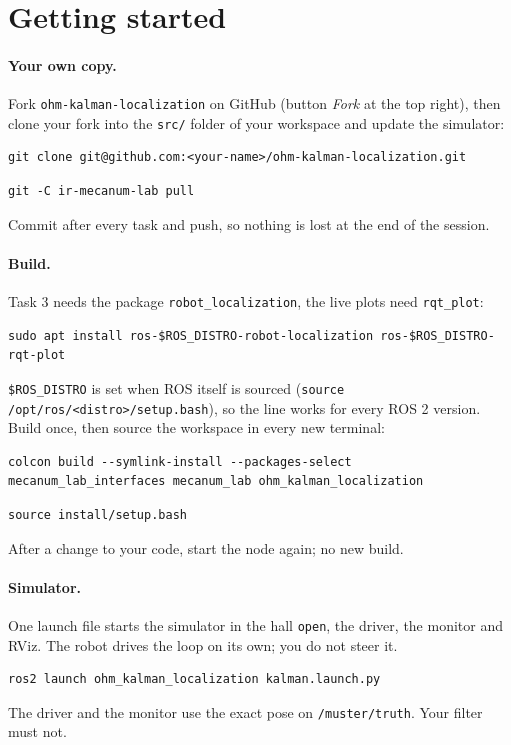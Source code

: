\documentclass[11pt,a4paper,parskip=half]{scrartcl}
\newcommand{\thema}[1]{\texttt{#1}}
\newcommand{\datei}[1]{\texttt{#1}}
\begin{document}
\newpage
\section{Getting started}
\paragraph{Your own copy.} Fork \datei{ohm-kalman-localization} on GitHub (button \emph{Fork} at the top
right), then clone your fork into the \datei{src/} folder of your workspace and update the simulator:
\begin{lstlisting}
git clone git@github.com:<your-name>/ohm-kalman-localization.git
\end{lstlisting}
\begin{lstlisting}
git -C ir-mecanum-lab pull
\end{lstlisting}
Commit after every task and push, so nothing is lost at the end of the session.

\paragraph{Build.} Task 3 needs the package \thema{robot\_localization}, the live plots need \thema{rqt\_plot}:
\begin{lstlisting}
sudo apt install ros-$ROS_DISTRO-robot-localization ros-$ROS_DISTRO-rqt-plot
\end{lstlisting}
\thema{\$ROS\_DISTRO} is set when ROS itself is sourced (\thema{source /opt/ros/<distro>/setup.bash}), so the line
works for every ROS 2 version.
Build once, then source the workspace in every new terminal:
\begin{lstlisting}
colcon build --symlink-install --packages-select mecanum_lab_interfaces mecanum_lab ohm_kalman_localization
\end{lstlisting}
\begin{lstlisting}
source install/setup.bash
\end{lstlisting}
After a change to your code, start the node again; no new build.

\paragraph{Simulator.} One launch file starts the simulator in the hall \thema{open}, the driver, the
monitor and RViz. The robot drives the loop on its own; you do not steer it.
\begin{lstlisting}
ros2 launch ohm_kalman_localization kalman.launch.py
\end{lstlisting}
The driver and the monitor use the exact pose on \thema{/muster/truth}. Your filter must not.
\end{document}
